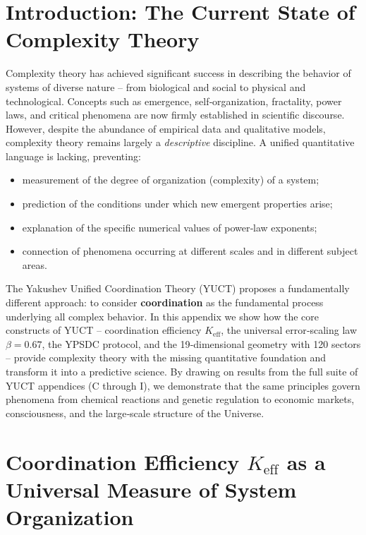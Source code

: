 \documentclass[11pt]{article}
\theoremstyle{remark}
\newcommand{\Keff}{K_{\mathrm{eff}}}
\begin{document}
	\tableofcontents
	\newpage
	
	\section{Introduction: The Current State of Complexity Theory}
	\label{sec:intro}
	
	Complexity theory has achieved significant success in describing the behavior of systems of diverse nature – from biological and social to physical and technological. Concepts such as emergence, self‑organization, fractality, power laws, and critical phenomena are now firmly established in scientific discourse. However, despite the abundance of empirical data and qualitative models, complexity theory remains largely a \emph{descriptive} discipline. A unified quantitative language is lacking, preventing:
	\begin{itemize}
		\item measurement of the degree of organization (complexity) of a system;
		\item prediction of the conditions under which new emergent properties arise;
		\item explanation of the specific numerical values of power‑law exponents;
		\item connection of phenomena occurring at different scales and in different subject areas.
	\end{itemize}
	
	The Yakushev Unified Coordination Theory (YUCT) proposes a fundamentally different approach: to consider \textbf{coordination} as the fundamental process underlying all complex behavior. In this appendix we show how the core constructs of YUCT – coordination efficiency $\Keff$, the universal error‑scaling law $\beta = 0.67$, the YPSDC protocol, and the 19‑dimensional geometry with 120 sectors – provide complexity theory with the missing quantitative foundation and transform it into a predictive science. By drawing on results from the full suite of YUCT appendices (C through I), we demonstrate that the same principles govern phenomena from chemical reactions and genetic regulation to economic markets, consciousness, and the large‑scale structure of the Universe.
	
	\section{Coordination Efficiency \texorpdfstring{$\Keff$}{Keff} as a Universal Measure of System Organization}
	\label{sec:keff}
	
\end{document}
